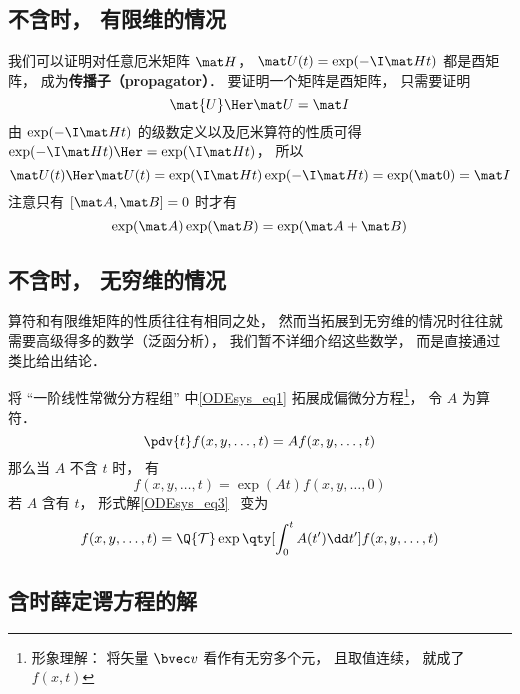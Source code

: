 

\subsection{不含时， 有限维的情况}
我们可以证明对任意厄米矩阵 $\mat H$， $\mat U(t) = \exp(-\I \mat H t)$ 都是酉矩阵， 成为\textbf{传播子（propagator）}． 要证明一个矩阵是酉矩阵， 只需要证明
\begin{equation}
\mat{U}\Her \mat U = \mat I
\end{equation}
由 $\exp(-\I \mat H t)$ 的级数定义以及厄米算符的性质可得 $\exp(-\I \mat H t)\Her = \exp(\I \mat H t)$， 所以
\begin{equation}
\mat U(t)\Her \mat U(t) = \exp(\I \mat H t) \exp(-\I \mat H t) = \exp(\mat 0) = \mat I
\end{equation}
注意只有 $[\mat A, \mat B] = 0$ 时才有
\begin{equation}
\exp(\mat A)\exp(\mat B) = \exp(\mat A + \mat B)
\end{equation}

\subsection{不含时， 无穷维的情况}

算符和有限维矩阵的性质往往有相同之处， 然而当拓展到无穷维的情况时往往就需要高级得多的数学（泛函分析）， 我们暂不详细介绍这些数学， 而是直接通过类比给出结论．

将 “一阶线性常微分方程组” 中\autoref{ODEsys_eq1} 拓展成偏微分方程\footnote{形象理解： 将矢量 $\bvec v$ 看作有无穷多个元， 且取值连续， 就成了 $f(x, t)$}， 令 $A$ 为算符．
\begin{equation}
\pdv{t} f(x, y, \dots, t) = A f(x, y, \dots, t)
\end{equation}
那么当 $A$ 不含 $t$ 时， 有
\begin{equation}
f(x, y, \dots, t) = \exp(A t) f(x, y, \dots, 0)
\end{equation}
若 $A$ 含有 $t$， 形式解\autoref{ODEsys_eq3}~ 变为
\begin{equation}
f(x, y, \dots, t) = \Q {\mathcal T} \exp\qty[\int_0^ t A(t')\dd t'] f(x, y, \dots, t)
\end{equation}

\subsection{含时薛定谔方程的解}

